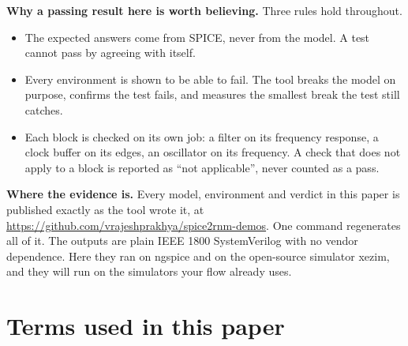 \documentclass[11pt,a4paper]{article}
\begin{document}
\medskip
\noindent\textbf{Why a passing result here is worth believing.} Three
rules hold throughout.
\begin{itemize}[leftmargin=1.5em,itemsep=0.2em]
  \item The expected answers come from SPICE, never from the model. A
        test cannot pass by agreeing with itself.
  \item Every environment is shown to be able to fail. The tool breaks
        the model on purpose, confirms the test fails, and measures
        the smallest break the test still catches.
  \item Each block is checked on its own job: a filter on its
        frequency response, a clock buffer on its edges, an oscillator
        on its frequency. A check that does not apply to a block is
        reported as ``not applicable'', never counted as a pass.
\end{itemize}

\medskip
\noindent\textbf{Where the evidence is.} Every model, environment and
verdict in this paper is published exactly as the tool wrote it, at
\url{https://github.com/vrajeshprakhya/spice2rnm-demos}. One command
regenerates all of it. The outputs are plain IEEE 1800 SystemVerilog
with no vendor dependence. Here they ran on ngspice and on the
open-source simulator xezim, and they will run on the simulators your
flow already uses.

\newpage
\tableofcontents
\vspace{0.2em}

\section*{Terms used in this paper}
\end{document}
